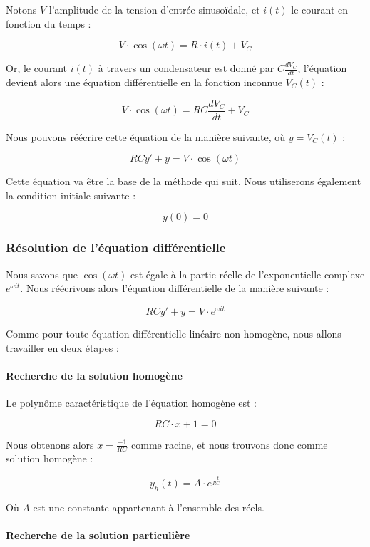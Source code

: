 Notons $V$ l'amplitude de la tension d'entrée sinusoïdale, et $i(t)$ le courant
en fonction du temps : 

$$V \cdot \cos (\omega t) = R \cdot i(t) + V_C$$

Or, le courant $i(t)$ à travers un condensateur est donné par $C \frac{dV_C}{dt}$, 
l'équation devient alors une équation différentielle en la fonction inconnue $V_C (t)$ :

$$V \cdot \cos (\omega t) = RC\frac{dV_C}{dt}  + V_C$$

Nous pouvons réécrire cette équation de la manière suivante, où $y = V_C(t)$ :

$$RCy' + y = V \cdot \cos (\omega t)$$

Cette équation va être la base de la méthode qui suit. Nous utiliserons également
la condition initiale suivante :

$$y(0) = 0$$

\subsubsection{Résolution de l'équation différentielle}

Nous savons que $\cos (\omega t)$ est égale à la partie réelle de l'exponentielle
complexe $e^{\omega i t}$. Nous réécrivons alors l'équation différentielle de la
manière suivante :

$$RCy' + y = V \cdot e^{\omega i t}$$

Comme pour toute équation différentielle linéaire non-homogène, nous allons travailler
en deux étapes :

\paragraph{Recherche de la solution homogène}

Le polynôme caractéristique de l'équation homogène est :

$$RC \cdot x + 1 = 0$$

Nous obtenons alors $x = \frac{-1}{RC}$ comme racine, et nous trouvons donc comme solution homogène :

$$y_h(t) = A \cdot e^{\frac{-t}{RC}}$$

Où $A$ est une constante appartenant à l'ensemble des réels. %

\paragraph{Recherche de la solution particulière}

